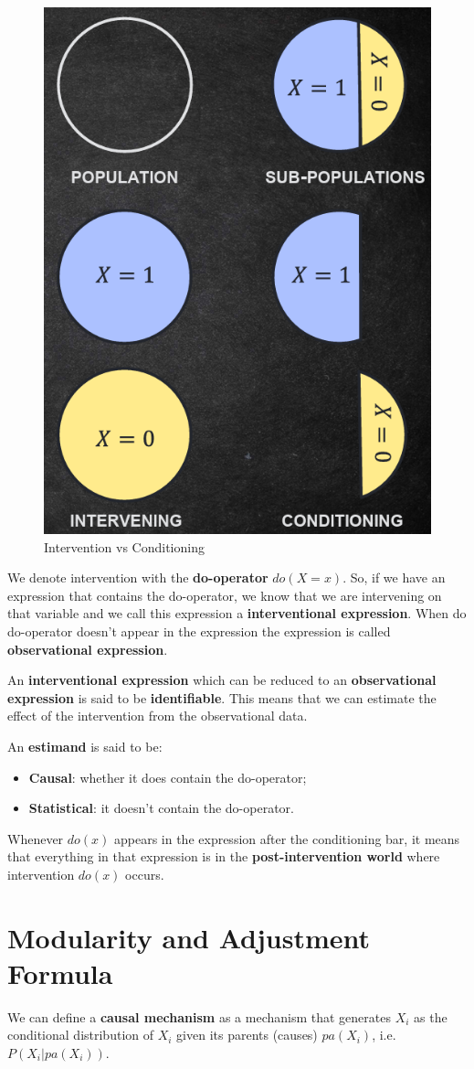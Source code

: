 \begin{figure}[!ht]
      \centering
      \includegraphics[width=0.3\linewidth]{img/causal_models/interventionVSconditioning.png}
      \caption{Intervention vs Conditioning}
      \label{fig:causal}
\end{figure}

We denote intervention with the \textbf{do-operator} $do(X = x)$. So, if we have
an expression that contains the do-operator, we know that we are intervening
on that variable and we call this expression a \textbf{interventional expression}.
When do do-operator doesn't appear in the expression the expression is called
\textbf{observational expression}.

An \textbf{interventional expression} which can be reduced to an \textbf{observational
      expression} is said to be \textbf{identifiable}. This means that we can
estimate the effect of the intervention from the observational data.

An \textbf{estimand} is said to be:
\begin{itemize}
      \item \textbf{Causal}: whether it does contain the do-operator;
      \item \textbf{Statistical}: it doesn't contain the do-operator.
\end{itemize}

Whenever $do(x)$ appears in the expression after the conditioning bar, it means
that everything in that expression is in the \textbf{post-intervention world}
where intervention $do(x)$ occurs.

\section{Modularity and Adjustment Formula}
We can define a \textbf{causal mechanism} as a mechanism that generates $X_i$ as
the conditional distribution of $X_i$ given its parents (causes) $pa(X_i)$, i.e. $P(X_i | pa(X_i))$.

